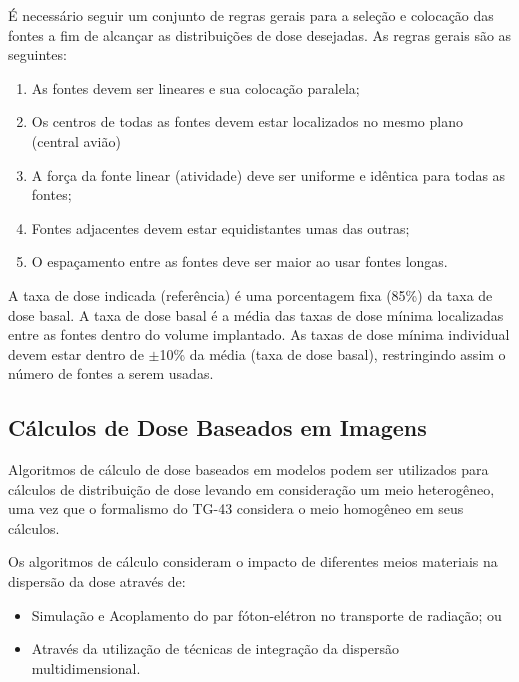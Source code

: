 \documentclass[11pt,a4paper]{article}
\begin{document}
\begin{itemize}
				É necessário seguir um conjunto de regras gerais para a seleção e colocação das fontes a fim de alcançar as distribuições de dose desejadas. As regras gerais são as seguintes:

				\begin{enumerate}[label=\textcolor{CarnationPink}{(\roman*)}]
					\item As fontes devem ser lineares e sua colocação paralela;
					\item Os centros de todas as fontes devem estar localizados no mesmo plano (central
					avião)
					\item A força da fonte linear (atividade) deve ser uniforme e idêntica para todas as fontes;
					\item Fontes adjacentes devem estar equidistantes umas das outras;
					\item O espaçamento entre as fontes deve ser maior ao usar fontes longas.
				\end{enumerate}

				A taxa de dose indicada (referência) é uma porcentagem fixa (85\%) da taxa de dose basal. A taxa de dose basal é a média das taxas de dose mínima localizadas entre as fontes dentro do volume implantado. As taxas de dose mínima individual devem estar dentro de $\pm$10\% da média (taxa de dose basal), restringindo assim o número de fontes a serem usadas.

			\end{itemize}


\subsection*{Cálculos de Dose Baseados em Imagens}

			Algoritmos de cálculo de dose baseados em modelos podem ser utilizados para cálculos de distribuição de dose levando em consideração um meio heterogêneo, uma vez que o formalismo do TG-43 considera o meio homogêneo em seus cálculos.
			
			Os algoritmos de cálculo consideram o impacto de diferentes meios materiais na dispersão da dose através de:

				\begin{itemize}[label=\textcolor{CarnationPink}{$\blacktriangleright$}]
					\item Simulação e Acoplamento do par fóton-elétron no transporte de radiação; ou
					\item Através da utilização de técnicas de integração da dispersão multidimensional.
				\end{itemize}
			
\end{document}

